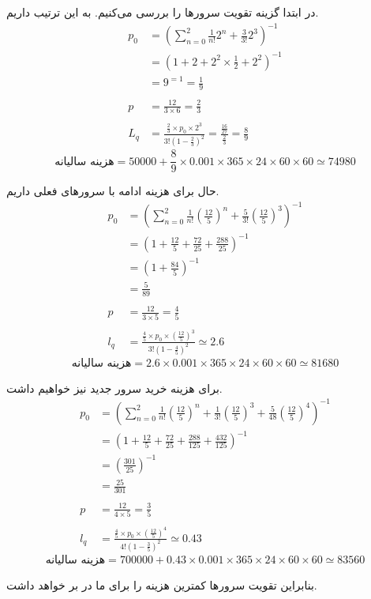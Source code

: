 در ابتدا گزینه تقویت سرورها را بررسی می‌کنیم. به این ترتیب داریم.
\begin{align*}
    p_0 &= \left( \sum_{n = 0}^2 \frac{1}{n!}2^n + \frac{3}{3!}2^3\right)^{-1} \\
    &= \left(1 + 2 + 2^2 \times \frac{1}{2} + 2^2\right)^{-1} \\
    &= 9^{=1} = \frac{1}{9} \\\\
    p &= \frac{12}{3 \times 6} =\frac{2}{3} \\\\
    L_q &= \frac{\frac{2}{3} \times p_0 \times 2^3}{3! (1 - \frac{2}{3})^2} = \frac{\frac{16}{27}}{\frac{2}{3}} = \frac{8}{9} 
\end{align*}
\[
    \text{هزینه سالیانه} = 50000 + \frac{8}{9} \times 0.001 \times 365 \times 24 \times 60 \times 60 \simeq 74980
\]

حال برای هزینه ادامه با سرورهای فعلی داریم.
\begin{align*}
    p_0 &= \left( \sum_{n = 0}^2 \frac{1}{n!}(\frac{12}{5})^n + \frac{5}{3!}(\frac{12}{5})^3\right)^{-1} \\
    &= \left(1 + \frac{12}{5} + \frac{72}{25} + \frac{288}{25}\right)^{-1} \\
    &= (1 + \frac{84}{5})^{-1} \\ 
    &= \frac{5}{89} \\\\
    p &= \frac{12}{3 \times 5} = \frac{4}{5} \\\\
    l_q &= \frac{\frac{4}{5} \times p_0 \times (\frac{12}{5})^3}{3! (1 - \frac{4}{5})^2} \simeq 2.6
\end{align*}
\[
    \text{هزینه سالیانه} = 2.6 \times 0.001 \times 365 \times 24 \times 60 \times 60 \simeq 81680
\]

برای هزینه خرید سرور جدید نیز خواهیم داشت.
\begin{align*}
    p_0 &= \left( \sum_{n = 0}^2 \frac{1}{n!}(\frac{12}{5})^n + \frac{1}{3!}(\frac{12}{5})^3 + \frac{5}{48}(\frac{12}{5})^4\right)^{-1} \\
    &= \left(1 + \frac{12}{5} + \frac{72}{25} + \frac{288}{125} + \frac{432}{125}\right)^{-1} \\
    &= (\frac{301}{25})^{-1} \\ 
    &= \frac{25}{301} \\\\
    p &= \frac{12}{4 \times 5} = \frac{3}{5} \\\\
    l_q &= \frac{\frac{4}{5} \times p_0 \times (\frac{12}{5})^4}{4! (1 - \frac{3}{5})^2} \simeq 0.43
\end{align*}
\[
    \text{هزینه سالیانه} = 700000 + 0.43 \times 0.001 \times 365 \times 24 \times 60 \times 60 \simeq 83560
\]

بنابراین تقویت سرورها کمترین هزینه را برای ما در بر خواهد داشت.
